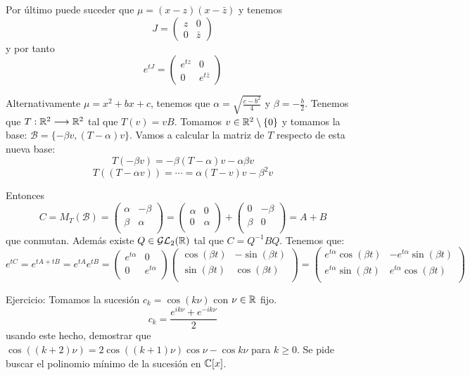 Por último puede suceder que \(\mu=(x-z)(x-\bar{z})\) y tenemos
\[
  J=\begin{pmatrix}
    z & 0\\
    0&  \bar{z}
  \end{pmatrix}
\]
y por tanto
\[
  e^{tJ}=\begin{pmatrix}
    e^{tz}& 0\\
    0&         e^{t\bar{z}}
  \end{pmatrix}
\]

Alternativamente \(\mu=x^2+bx+c\), tenemos que
\(\alpha=\sqrt{\frac{c-b^2}{4}}\) y \(\beta=-\frac{b}{2}\).
Tenemos que \(T:\mathbb{R}^2 \longrightarrow\mathbb{R}^2\) tal que \(T(v)=vB\).
Tomamos \(v\in\mathbb{R}^2\setminus\{0\}\) y tomamos la base:
\(\mathcal{B}=\{-\beta v,{(T-\alpha)}v\}\).
Vamos a calcular la matriz de \(T\)
respecto de esta nueva base:
\[
  T(-\beta v)=-\beta{(T-\alpha)}v-\alpha\beta v
\]
\[
  T((T-\alpha v))=\cdots=\alpha{(T-v)}v-\beta^2 v
\]

Entonces
\[
  C=M_T(\mathcal{B})=
  \begin{pmatrix}
    \alpha&-\beta\\
    \beta&\alpha\\
  \end{pmatrix}=
  \begin{pmatrix}
    \alpha&0\\
    0&\alpha\\
  \end{pmatrix}+
  \begin{pmatrix}
    0&-\beta\\
    \beta&0\\
  \end{pmatrix}
  =A+B
\]
que conmutan. Además
existe \(Q\in\mathcal{GL}_2(\mathbb{R})\) tal que \(C=Q^{-1}BQ\). Tenemos que:
\[
  e^{tC}=e^{tA+tB}=e^{tA}e^{tB}=
  \begin{pmatrix}
    e^{t\alpha}&0\\
    0&e^{t\alpha}\\
  \end{pmatrix}
  \begin{pmatrix}
    \cos(\beta t)& -\sin(\beta t)\\
    \sin(\beta t)&\cos(\beta t) \\
  \end{pmatrix}=
  \begin{pmatrix}
    e^{t\alpha}\cos(\beta t)& -e^{t\alpha}\sin(\beta t)\\
    e^{t\alpha}\sin(\beta t)&e^{t\alpha}\cos(\beta t) \\
  \end{pmatrix}
\]

Ejercicio: Tomamos la sucesión \(c_k=\cos(k\nu)\) con \(\nu\in\mathbb{R}\) fijo.
\[
  c_k=\frac{e^{ik\nu}+e^{-ik\nu}}{2}
\]
usando este hecho, demostrar que \(\cos((k+2)\nu)=
2\cos((k+1)\nu)\cos\nu-\cos k\nu\) para \(k\ge0\). Se pide buscar
el polinomio mínimo de la sucesión en \(\mathbb{C}[x]\).

